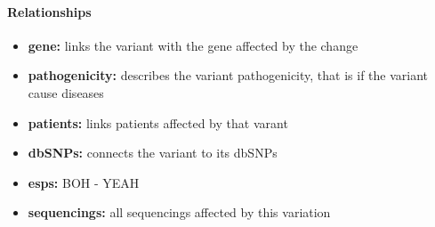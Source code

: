 \paragraph{Relationships}   
\begin{itemize}
	\item \textbf{gene:} links the variant with the gene affected by the change
	\item \textbf{pathogenicity:} describes the variant pathogenicity, that is if the variant cause diseases
  	\item \textbf{patients:} links patients affected by that varant
  	\item \textbf{dbSNPs:} connects the variant to its dbSNPs
  	\item \textbf{esps:} BOH - YEAH
  	\item \textbf{sequencings:} all sequencings affected by this variation
\end{itemize}
 




